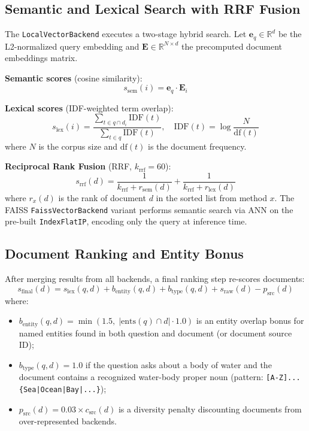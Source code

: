 \documentclass[conference]{IEEEtran}
\begin{document}
\subsection{Semantic and Lexical Search with RRF Fusion}
\label{sec:rrf}

The \texttt{LocalVectorBackend} executes a two-stage hybrid search.
Let $\mathbf{e}_q \in \mathbb{R}^d$ be the L2-normalized query embedding
and $\mathbf{E} \in \mathbb{R}^{N \times d}$ the precomputed document
embeddings matrix.

\textbf{Semantic scores} (cosine similarity):
\begin{equation}
  s_{\text{sem}}(i) = \mathbf{e}_q \cdot \mathbf{E}_i
  \label{eq:cosine}
\end{equation}

\textbf{Lexical scores} (IDF-weighted term overlap):
\begin{equation}
  s_{\text{lex}}(i) = \frac{\sum_{t \in q \cap d_i} \text{IDF}(t)}
    {\sum_{t \in q} \text{IDF}(t)}, \quad
  \text{IDF}(t) = \log\frac{N}{\text{df}(t)}
  \label{eq:idf}
\end{equation}
where $N$ is the corpus size and $\text{df}(t)$ is the document frequency.

\textbf{Reciprocal Rank Fusion} (RRF, $k_{\text{rrf}}=60$):
\begin{equation}
  s_{\text{rrf}}(d) = \frac{1}{k_{\text{rrf}} + r_{\text{sem}}(d)} +
                       \frac{1}{k_{\text{rrf}} + r_{\text{lex}}(d)}
  \label{eq:rrf}
\end{equation}
where $r_x(d)$ is the rank of document $d$ in the sorted list from
method $x$.  The FAISS \texttt{FaissVectorBackend} variant performs
semantic search via ANN on the pre-built \texttt{IndexFlatIP},
encoding only the query at inference time.

\subsection{Document Ranking and Entity Bonus}
\label{sec:rank}

After merging results from all backends, a final ranking step
re-scores documents:
\begin{equation}
  s_{\text{final}}(d) = s_{\text{lex}}(q, d) + b_{\text{entity}}(q, d)
                       + b_{\text{type}}(q, d) + s_{\text{raw}}(d)
                       - p_{\text{src}}(d)
  \label{eq:final}
\end{equation}
where:
\begin{itemize}
  \item $b_{\text{entity}}(q,d) = \min(1.5,\; |\text{ents}(q) \cap d| \cdot 1.0)$
  is an entity overlap bonus for named entities found in both question
  and document (or document source ID);
  \item $b_{\text{type}}(q,d)= 1.0$ if the question asks about a body
  of water and the document contains a recognized water-body proper noun
  (pattern: \texttt{[A-Z]...\{Sea|Ocean|Bay|...\}});
  \item $p_{\text{src}}(d) = 0.03 \times c_{\text{src}}(d)$ is a
  diversity penalty discounting documents from over-represented backends.
\end{itemize}
\end{document}
